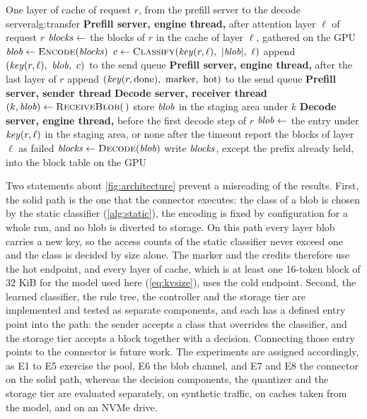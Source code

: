 \begin{pseudocode}{One layer of cache of request $r$, from the prefill server to the decode server}{alg:transfer}
  \Statex \textbf{Prefill server, engine thread,} after attention layer $\ell$ of request $r$
  \State $\mathit{blocks} \gets$ the blocks of $r$ in the cache of layer $\ell$, gathered on the GPU
  \State $\var{blob} \gets \Call{Encode}{\var{blocks}}$ 
  \State $c \gets \Call{Classify}{\var{key}(r,\ell),\ |\var{blob}|,\ \ell}$ 
  \State append $(\mathit{key}(r,\ell),\ \mathit{blob},\ c)$ to the send queue
  \Statex \textbf{Prefill server, engine thread,} after the last layer of $r$
  \State append $(\var{key}(r,\text{done}),\ \text{marker},\ \text{hot})$ to the send queue
  \Statex \textbf{Prefill server, sender thread}
    \State {} 
  \EndFor
  \Statex \textbf{Decode server, receiver thread}
  \Loop
    \State $(k, \var{blob}) \gets \Call{ReceiveBlob}{\,}$ 
    \State store $\mathit{blob}$ in the staging area under $k$
  \EndLoop
  \Statex \textbf{Decode server, engine thread,} before the first decode step of $r$
    \State $\mathit{blob} \gets$ the entry under $\mathit{key}(r,\ell)$ in the staging area, or none after the timeout
      \State report the blocks of layer $\ell$ as failed 
    \Else
      \State $\var{blocks} \gets \Call{Decode}{\var{blob}}$
      \State write $\mathit{blocks}$, except the prefix already held, into the block table on the GPU
    \EndIf
  \EndFor
\end{pseudocode}

Two statements about \cref{fig:architecture} prevent a misreading of the
results. First, the solid path is the one that the connector executes: the
class of a blob is chosen by the static classifier (\cref{alg:static}), the
encoding is fixed by configuration for a whole run, and no blob is diverted
to storage. On this path every layer blob carries a new key, so the access
counts of the static classifier never exceed one and the class is decided by
size alone. The marker and the credits therefore use the hot endpoint, and
every layer of cache, which is at least one 16-token block of 32 KiB for the
model used here (\cref{eq:kvsize}), uses the cold endpoint. Second, the
learned classifier, the rule tree, the controller and the storage tier are
implemented and tested as separate components, and each has a defined entry
point into the path: the sender accepts a class that overrides the
classifier, and the storage tier accepts a block together with a decision.
Connecting those entry points to the connector is future work. The experiments are assigned accordingly, as E1 to E5
exercise the pool, E6 the blob channel, and E7 and E8 the connector on the
solid path, whereas the decision components, the quantizer and the storage
tier are evaluated separately, on synthetic traffic, on caches taken from the
model, and on an NVMe drive.

